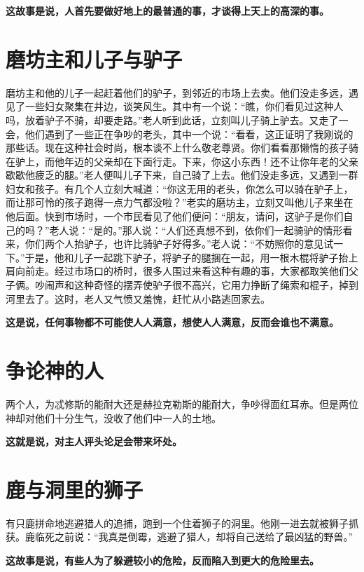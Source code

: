 {\bfseries \color{red}这故事是说，人首先要做好地上的最普通的事，才谈得上天上的高深的事。}

\section{磨坊主和儿子与驴子}

磨坊主和他的儿子一起赶着他们的驴子，到邻近的市场上去卖。他们没走多远，遇见了一些妇女聚集在井边，谈笑风生。其中有一个说：“瞧，你们看见过这种人吗，放着驴子不骑，却要走路。”老人听到此话，立刻叫儿子骑上驴去。又走了一会，他们遇到了一些正在争吵的老头，其中一个说：“看看，这正证明了我刚说的那些话。现在这种社会时尚，根本谈不上什么敬老尊贤。你们看看那懒惰的孩子骑在驴上，而他年迈的父亲却在下面行走。下来，你这小东西！还不让你年老的父亲歇歇他疲乏的腿。”老人便叫儿子下来，自己骑了上去。他们没走多远，又遇到一群妇女和孩子。有几个人立刻大喊道：“你这无用的老头，你怎么可以骑在驴子上，而让那可怜的孩子跑得一点力气都没啦？”老实的磨坊主，立刻又叫他儿子来坐在他后面。快到市场时，一个市民看见了他们便问：“朋友，请问，这驴子是你们自己的吗？”老人说：“是的。”那人说：“人们还真想不到，依你们一起骑驴的情形看来，你们两个人抬驴子，也许比骑驴子好得多。”老人说：“不妨照你的意见试一下。”于是，他和儿子一起跳下驴子，将驴子的腿捆在一起，用一根木棍将驴子抬上肩向前走。经过市场口的桥时，很多人围过来看这种有趣的事，大家都取笑他们父子俩。吵闹声和这种奇怪的摆弄使驴子很不高兴，它用力挣断了绳索和棍子，掉到河里去了。这时，老人又气愤又羞愧，赶忙从小路逃回家去。

{\bfseries \color{red}这是说，任何事物都不可能使人人满意，想使人人满意，反而会谁也不满意。}

\section{争论神的人}

两个人，为忒修斯的能耐大还是赫拉克勒斯的能耐大，争吵得面红耳赤。但是两位神却对他们十分生气，没收了他们中一人的土地。

{\bfseries \color{red}这就是说，对主人评头论足会带来坏处。}

\section{鹿与洞里的狮子}

有只鹿拼命地逃避猎人的追捕，跑到一个住着狮子的洞里。他刚一进去就被狮子抓获。鹿临死之前说：“我真是倒霉，逃避了猎人，却将自己送给了最凶猛的野兽。”

{\bfseries \color{red}这故事是说，有些人为了躲避较小的危险，反而陷入到更大的危险里去。}

